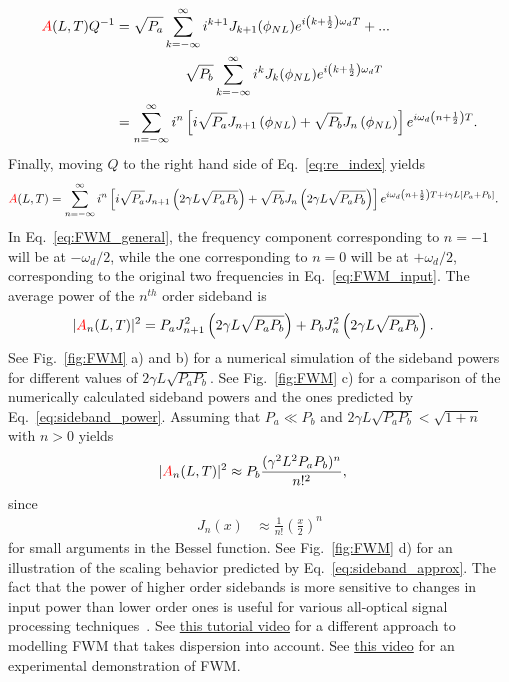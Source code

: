 \begin{align}
\label{eq:re_index}
    \textcolor{red}{A}(L,T)Q^{-1}&=\sqrt{P_a}\sum_{k=-\infty}^{\infty}i^{k+1}J_{k+1}(\phi_{NL})e^{i\left(k+\frac{1}{2}\right)\omega_dT}+...\\ \nonumber & \quad\quad\quad\quad\quad\sqrt{P_b}\sum_{k=-\infty}^{\infty}i^kJ_k(\phi_{NL})e^{i\left(k+\frac{1}{2}\right)\omega_dT} \\ \nonumber
    &= \sum_{n=-\infty}^{\infty} i^n\left[i\sqrt{P_a}J_{n+1}\left(\phi_{NL}\right)+\sqrt{P_b}J_n\left(\phi_{NL}\right)\right]e^{i\omega_d\left(n+\frac{1}{2}\right)T}.
\end{align}
Finally, moving $Q$ to the right hand side of Eq.~\ref{eq:re_index} yields
\begin{align}
\label{eq:FWM_general}
    \textcolor{red}{A}(L,T)&=\sum_{n=-\infty}^{\infty} i^n\left[i\sqrt{P_a}J_{n+1}\left(2\gamma L\sqrt{P_aP_b}\right)+\sqrt{P_b}J_n\left(2\gamma L\sqrt{P_aP_b}\right)\right]e^{i\omega_d\left(n+\frac{1}{2}\right)T+i\gamma L[P_a+P_b]}.
\end{align}
In Eq.~\ref{eq:FWM_general}, the frequency component corresponding to $n=-1$ will be at $-\omega_d/2$, while the one corresponding to $n=0$ will be at $+\omega_d/2$, corresponding to the original two frequencies in Eq.~\ref{eq:FWM_input}. The average power of the $n^{th}$ order sideband is
\begin{align}
\label{eq:sideband_power}
    |\textcolor{red}{A}_n(L,T)|^2 &= P_aJ^2_{n+1}\left(2\gamma L \sqrt{P_aP_b}\right)+P_bJ^2_{n}\left(2\gamma L \sqrt{P_aP_b}\right).
\end{align}
See Fig.~\ref{fig:FWM} a) and b) for a numerical simulation of the sideband powers for different values of $2\gamma L \sqrt{P_aP_b}$. See Fig.~\ref{fig:FWM} c) for a comparison of the numerically calculated sideband powers and the ones predicted by Eq.~\ref{eq:sideband_power}. Assuming that $P_a\ll P_b$ and $2\gamma L\sqrt{P_aP_b}<\sqrt{1+n}$ with $n>0$ yields
\begin{align}
\label{eq:sideband_approx}
    |\textcolor{red}{A}_n(L,T)|^2 &\approx P_b\frac{(\gamma^2 L^2P_aP_b)^{n}}{n!^2},
\end{align}
since
\begin{align}
\label{eq:Bessel_approx}
    J_n(x)&\approx \frac{1}{n!}\left(\frac{x}{2}\right)^n
\end{align}
for small arguments in the Bessel function. See Fig.~\ref{fig:FWM} d) for an illustration of the scaling behavior predicted by Eq.~\ref{eq:sideband_approx}. The fact that the power of higher order sidebands is more sensitive to changes in input power than lower order ones is useful for various all-optical signal processing techniques~\cite{my_thesis,BenoitPhD,YangLuPhD}. See \href{https://youtu.be/0SXPvO89jto}{this tutorial video} for a different approach to modelling FWM that takes dispersion into account. See \href{https://youtu.be/gsa9hrCbnqI}{this video} for an experimental demonstration of FWM. 
